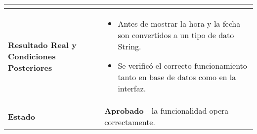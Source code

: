 \begin{longtable}{|p{5cm}|p{10cm}|}
\begin{itemize}
	\end{itemize} \\
	\hline
	\textbf{Resultado Real y Condiciones Posteriores} & 
	\begin{itemize}
		\item Antes de mostrar la hora y la fecha son convertidos a un tipo de dato String.
		\item Se verificó el correcto funcionamiento tanto en base de datos como en la interfaz.
	\end{itemize} \\
	\hline
	\textbf{Estado} & 
	\textbf{Aprobado} - la funcionalidad opera correctamente. \\
	\hline
\end{longtable}